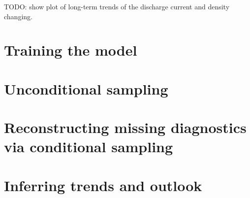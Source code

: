 TODO: show plot of long-term trends of the discharge current and density changing.

\section{Training the model}

\section{Unconditional sampling}

\section{Reconstructing missing diagnostics via conditional sampling}

\section{Inferring trends and outlook}